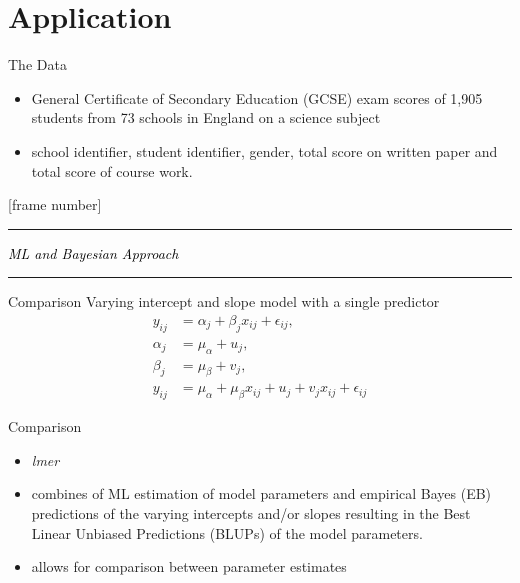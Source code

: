 \section{Application}

\begin{frame}{The Data}
	\Large{
	\begin{itemize}
		\item[]  General Certificate of Secondary Education (GCSE) exam scores of 1,905 students from 73 schools in England on a science subject
		\item[]  school identifier, student identifier, gender, total score on written paper and total score of course work.

	\end{itemize}
	}
\end{frame}

[frame number]{}
  \begin{frame}
  \textcolor{myred}{\rule{\textwidth}{2pt}}
  \vfill
  \centering
	\itshape \LARGE \textcolor{black}{ML and Bayesian Approach}\\
  \itshape \Large \textcolor{black}{\textbf{\insertsectionhead}}
  \vfill
  \textcolor{myred}{\rule{\textwidth}{2pt}}
  \end{frame}
\addtocounter{framenumber}{-1}

\begin{frame}{Comparison}
	\Large{
		 Varying intercept and slope model with a single predictor
		\begin{align}
			y_{ij} &= \alpha_j + \beta_j x_{ij} +\epsilon_{ij},\\[0.5em]
			\alpha_j &= \mu_\alpha + u_j,\\[0.5em]
			\beta_j &= \mu_\beta + v_j,\\[0.5em]
			y_{ij} &= \mu_\alpha + \mu_\beta x_{ij} + u_j + v_j x_{ij} + \epsilon_{ij}
		\end{align}
	}
\end{frame}

\begin{frame}{Comparison}
	\Large{
		\begin{itemize}
		\item[]  \textit{lmer}
		\item[]  combines of ML estimation of model parameters and empirical Bayes (EB) predictions of the varying intercepts and/or slopes resulting in the Best Linear Unbiased Predictions (BLUPs) of the model parameters.
		\item[]  allows for comparison between parameter estimates
		\end{itemize}
	}
\end{frame}

